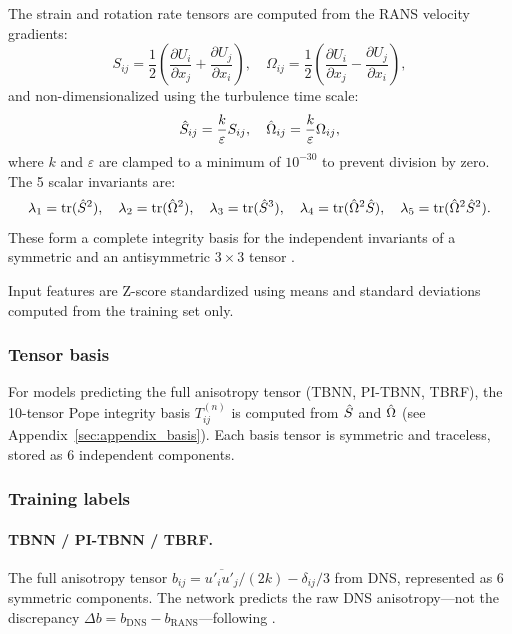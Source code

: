 The strain and rotation rate tensors are computed from the RANS velocity gradients:
\begin{equation}
    S_{ij} = \frac{1}{2}\left(\frac{\partial U_i}{\partial x_j} + \frac{\partial U_j}{\partial x_i}\right), \quad
    \Omega_{ij} = \frac{1}{2}\left(\frac{\partial U_i}{\partial x_j} - \frac{\partial U_j}{\partial x_i}\right),
\end{equation}
and non-dimensionalized using the turbulence time scale:
\begin{equation}
    \hat{S}_{ij} = \frac{k}{\varepsilon} S_{ij}, \quad \hat{\Omega}_{ij} = \frac{k}{\varepsilon} \Omega_{ij},
\end{equation}
where $k$ and $\varepsilon$ are clamped to a minimum of $10^{-30}$ to prevent division by zero.
The 5 scalar invariants are:
\begin{equation}
    \lambda_1 = \mathrm{tr}(\hat{S}^2), \quad
    \lambda_2 = \mathrm{tr}(\hat{\Omega}^2), \quad
    \lambda_3 = \mathrm{tr}(\hat{S}^3), \quad
    \lambda_4 = \mathrm{tr}(\hat{\Omega}^2 \hat{S}), \quad
    \lambda_5 = \mathrm{tr}(\hat{\Omega}^2 \hat{S}^2).
\end{equation}
These form a complete integrity basis for the independent invariants of a symmetric and an antisymmetric $3 \times 3$ tensor \citep{Pope1975}.

Input features are Z-score standardized using means and standard deviations computed from the training set only.

\subsubsection{Tensor basis}

For models predicting the full anisotropy tensor (TBNN, PI-TBNN, TBRF), the 10-tensor Pope integrity basis $T^{(n)}_{ij}$ is computed from $\hat{S}$ and $\hat{\Omega}$ (see Appendix~\ref{sec:appendix_basis}).
Each basis tensor is symmetric and traceless, stored as 6 independent components.

\subsubsection{Training labels}

\paragraph{TBNN / PI-TBNN / TBRF.} The full anisotropy tensor $b_{ij} = \overline{u'_i u'_j} / (2k) - \delta_{ij}/3$ from DNS, represented as 6 symmetric components.
The network predicts the raw DNS anisotropy---not the discrepancy $\Delta b = b_{\mathrm{DNS}} - b_{\mathrm{RANS}}$---following \citet{Ling2016}.

